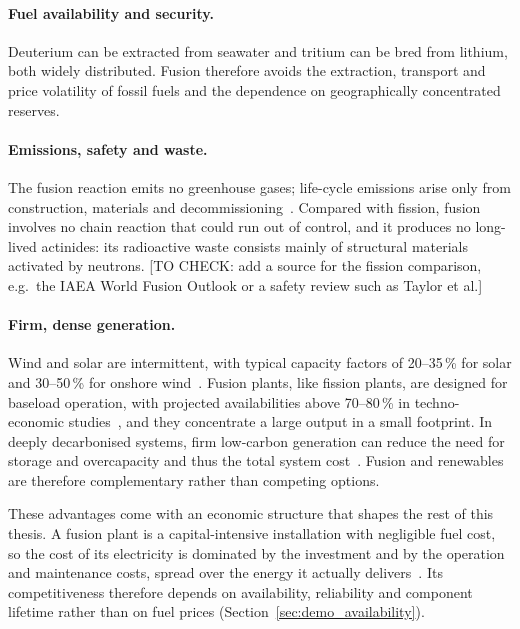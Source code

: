 \documentclass{book}
\newcommand{\tocheck}[1]{{\color{red}\small[TO CHECK: #1]}}
\begin{document}
\paragraph{Fuel availability and security.}
Deuterium can be extracted from seawater and tritium can be bred from
lithium, both widely distributed. Fusion therefore avoids the extraction,
transport and price volatility of fossil fuels and the dependence on
geographically concentrated reserves.

\paragraph{Emissions, safety and waste.}
The fusion reaction emits no greenhouse gases; life-cycle emissions arise only
from construction, materials and decommissioning~\cite{ipcc_ar6_syr_2023}.
Compared with fission, fusion involves no chain reaction that could run out of
control, and it produces no long-lived actinides: its radioactive waste
consists mainly of structural materials activated by neutrons.
\tocheck{add a source for the fission comparison, e.g.\ the IAEA World Fusion
Outlook or a safety review such as Taylor et al.}

\paragraph{Firm, dense generation.}
Wind and solar are intermittent, with typical capacity factors of 20--35\,\%
for solar and 30--50\,\% for onshore wind~\cite{IEA2023}. Fusion plants, like
fission plants, are designed for baseload operation, with projected
availabilities above 70--80\,\% in techno-economic studies~\cite{Lindley2023},
and they concentrate a large output in a small footprint. In deeply
decarbonised systems, firm low-carbon generation can reduce the need for
storage and overcapacity and thus the total system
cost~\cite{Lindley2023}. Fusion and renewables are therefore complementary
rather than competing options.

These advantages come with an economic structure that shapes the rest of this
thesis. A fusion plant is a capital-intensive installation with negligible
fuel cost, so the cost of its electricity is dominated by the investment and
by the operation and maintenance costs, spread over the energy it actually
delivers~\cite{Lindley2023}. Its competitiveness therefore depends on
availability, reliability and component lifetime rather than on fuel prices
(Section~\ref{sec:demo_availability}).
\end{document}

